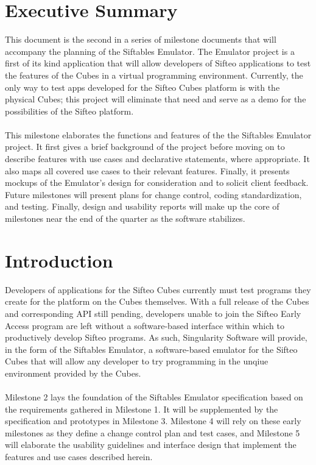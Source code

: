 \documentclass[12pt]{article}
\begin{document}
\section{Executive Summary}
This document is the second in a series of milestone documents that will accompany the planning of the Siftables Emulator. The Emulator project is a first of its kind application that will allow developers of Sifteo applications to test the features of the Cubes in a virtual programming environment. Currently, the only way to test apps developed for the Sifteo Cubes platform is with the physical Cubes; this project will eliminate that need and serve as a demo for the possibilities of the Sifteo platform.\\\\
This milestone elaborates the functions and features of the the Siftables Emulator project. It first gives a brief background of the project before moving on to describe features with use cases and declarative statements, where appropriate. It also maps all covered use cases to their relevant features. Finally, it presents mockups of the Emulator's design for consideration and to solicit client feedback.  Future milestones will present plans for change control, coding standardization, and testing. Finally, design and usability reports will make up the core of milestones near the end of the quarter as the software stabilizes.


\section{Introduction}
Developers of applications for the \gls{Sifteo Cubes} currently must test programs they create for the platform on the Cubes themselves.  With a full release of the Cubes and corresponding \gls{API} still pending, developers unable to join the Sifteo Early Access program are left without a software-based interface within which to productively develop Sifteo programs. As such, Singularity Software will provide, in the form of the Siftables Emulator, a software-based emulator for the Sifteo Cubes that will allow any developer to try programming in the unqiue environment provided by the Cubes.\\\\
Milestone 2 lays the foundation of the Siftables Emulator specification based on the requirements gathered in Milestone 1. It will be supplemented by the specification and prototypes in Milestone 3. Milestone 4 will rely on these early milestones as they define a change control plan and test cases, and Milestone 5 will elaborate the usability guidelines and interface design that implement the features and use cases described herein.
\end{document}
